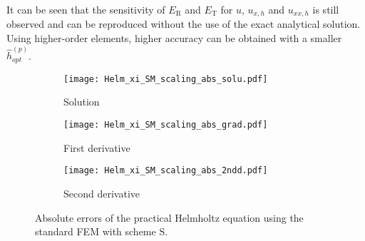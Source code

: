 \documentclass[final,3p]{elsarticle}
\begin{document}
It can be seen that the sensitivity of ${E}_{\text{R}}$ and ${E}_{\text{T}}$ for $u$, $u_{x,h}$ and $u_{xx,h}$ is still observed and can be reproduced without the use of the exact analytical solution.
Using higher-order elements, higher accuracy can be obtained with a smaller $\hat h_{opt} ^{(p)}$.



\begin{figure}[!ht]
    \begin{subfigure}{5.5cm}
        \texttt{[image: Helm\_xi\_SM\_scaling\_abs\_solu.pdf]}
        \caption{Solution}
        \label{Fig:Helm_xi_SM_scaling_abs_solu}
    \end{subfigure}
    \begin{subfigure}{5.5cm}
        \texttt{[image: Helm\_xi\_SM\_scaling\_abs\_grad.pdf]}
        \caption{First derivative}
        \label{Fig:Helm_xi_SM_scaling_abs_grad}
    \end{subfigure}
    \begin{subfigure}{5.5cm}
        \texttt{[image: Helm\_xi\_SM\_scaling\_abs\_2ndd.pdf]}
        \caption{Second derivative}
        \label{Fig:Helm_xi_SM_scaling_abs_2ndd}
    \end{subfigure}    
\caption{Absolute errors of the practical Helmholtz equation using the standard FEM with scheme S.}
\label{Fig:Helm_xi_SM_scaling_abs}
\end{figure}
\end{document}
